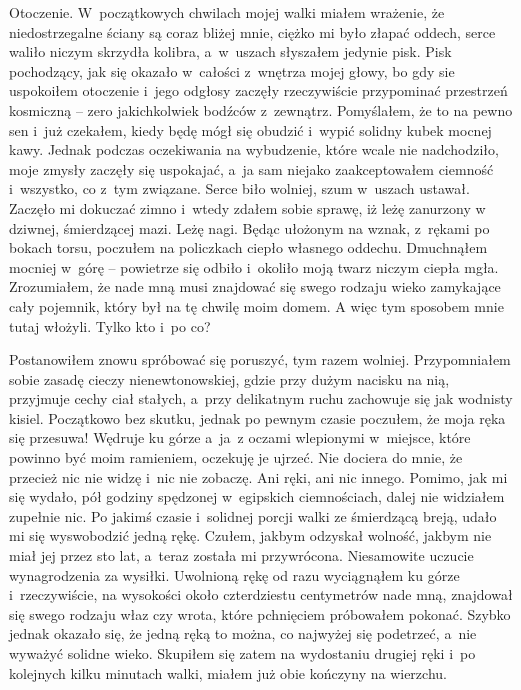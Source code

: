 Otoczenie. W~początkowych chwilach mojej walki miałem wrażenie, że niedostrzegalne ściany są coraz bliżej mnie, ciężko mi było złapać oddech, serce waliło niczym skrzydła kolibra, a~w~uszach słyszałem jedynie pisk. Pisk pochodzący, jak się okazało w~całości z~wnętrza mojej głowy, bo gdy sie uspokoiłem otoczenie i~jego odgłosy zaczęły rzeczywiście przypominać przestrzeń kosmiczną -- zero jakichkolwiek bodźców z~zewnątrz. Pomyślałem, że to na pewno sen i~już czekałem, kiedy będę mógł się obudzić i~wypić solidny kubek mocnej kawy. Jednak podczas oczekiwania na wybudzenie, które wcale nie nadchodziło, moje zmysły zaczęły się uspokajać, a~ja sam niejako zaakceptowałem ciemność i~wszystko, co z~tym związane. Serce biło wolniej, szum w~uszach ustawał. Zaczęło mi dokuczać zimno i~wtedy zdałem sobie sprawę, iż leżę zanurzony w dziwnej, śmierdzącej mazi. Leżę nagi. Będąc ułożonym na wznak, z~rękami po bokach torsu, poczułem na policzkach ciepło własnego oddechu. Dmuchnąłem mocniej w~górę -- powietrze się odbiło i~okoliło moją twarz niczym ciepła mgła. Zrozumiałem, że nade mną musi znajdować się swego rodzaju wieko zamykające cały pojemnik, który był na tę chwilę moim domem. A więc tym sposobem mnie tutaj włożyli. Tylko kto i~po co? 

Postanowiłem znowu spróbować się poruszyć, tym razem wolniej. Przypomniałem sobie zasadę cieczy nienewtonowskiej, gdzie przy dużym nacisku na nią, przyjmuje cechy ciał stałych, a~przy delikatnym ruchu zachowuje się jak wodnisty kisiel. Początkowo bez skutku, jednak po pewnym czasie poczułem, że moja ręka się przesuwa! Wędruje ku górze a~ja~z oczami wlepionymi w~miejsce, które powinno być moim ramieniem, oczekuję je ujrzeć. Nie dociera do mnie, że przecież nic nie widzę i~nic nie zobaczę. Ani ręki, ani nic innego. Pomimo, jak mi się wydało, pół godziny spędzonej w~egipskich ciemnościach, dalej nie widziałem zupełnie nic. Po jakimś czasie i~solidnej porcji walki ze śmierdzącą breją, udało mi się wyswobodzić jedną rękę. Czułem, jakbym odzyskał wolność, jakbym nie miał jej przez sto lat, a~teraz została mi przywrócona. Niesamowite uczucie wynagrodzenia za wysiłki. Uwolnioną rękę od razu wyciągnąłem ku górze i~rzeczywiście, na wysokości około czterdziestu centymetrów nade mną, znajdował się swego rodzaju właz czy wrota, które pchnięciem próbowałem pokonać. Szybko jednak okazało się, że jedną ręką to można, co najwyżej się podetrzeć, a~nie wyważyć solidne wieko. Skupiłem się zatem na wydostaniu drugiej ręki i~po kolejnych kilku minutach walki, miałem już obie kończyny na wierzchu. 

